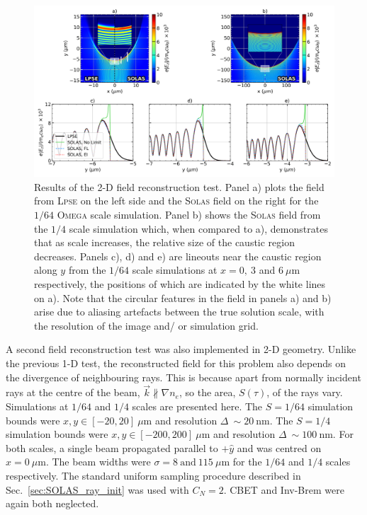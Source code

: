 \begin{figure}[t!]
    \includegraphics[width=1.0\linewidth]{Numerics/Images/2D_field_reconstruction_lineouts_alt.png}
    \centering
    \caption{Results of the 2-D field reconstruction test.
    Panel a) plots the field from \textsc{Lpse} on the left side and the \textsc{Solas} field on the right for the $1/64$ \textsc{Omega} scale simulation.
    Panel b) shows the \textsc{Solas} field from the $1/4$ scale simulation which, when compared to a), demonstrates that as scale increases, the relative size of the caustic region decreases.
    Panels c), d) and e) are lineouts near the caustic region along $y$ from the $1/64$ scale simulations at $x=0,\ 3$ and $6\ \mu\text{m}$ respectively, the positions of which are indicated by the white lines on a).
    Note that the circular features in the field in panels a) and b) arise due to aliasing artefacts between the true solution scale, with the resolution of the image and/ or simulation grid.}%
    \label{fig:SOLAS_2d_field_test}
\end{figure}

A second field reconstruction test was also implemented in 2-D geometry.
Unlike the previous 1-D test, the reconstructed field for this problem also depends on the divergence of neighbouring rays.
This is because apart from normally incident rays at the centre of the beam, $\vec{k}\nparallel\nabla n_e$, so the area, $S(\tau)$, of the rays vary.
Simulations at $1/64$ and $1/4$ scales are presented here.
The $S=1/64$ simulation bounds were $x,y\in [-20,20]\ \mu\text{m}$ and resolution $\Delta\ \sim 20\ \text{nm}$.
The $S=1/4$ simulation bounds were $x,y\in [-200,200]\ \mu\text{m}$ and resolution $\Delta\ \sim 100\ \text{nm}$.
For both scales, a single beam propagated parallel to $+\hat{y}$ and was centred on $x=0\ \mu\text{m}$.
The beam widths were $\sigma=8\ \text{and}\ 115\ \mu\text{m}$ for the $1/64$ and $1/4$ scales respectively.
The standard uniform sampling procedure described in Sec.~\ref{sec:SOLAS_ray_init} was used with $C_N=2$.
\ac{CBET} and \ac{Inv-Brem} were again both neglected.

